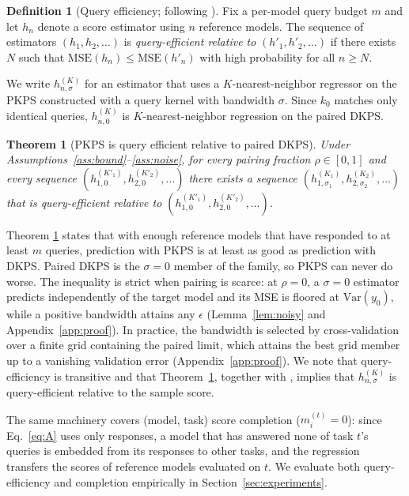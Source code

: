 \documentclass{article}
\newtheorem{theorem}{Theorem}
\theoremstyle{definition}
\newtheorem{definition}{Definition}
\theoremstyle{remark}
\theoremstyle{plain}
\newcommand{\PKPS}{PKPS\xspace}
\begin{document}
\begin{definition}[Query efficiency; following \citealp{dkps_qeff}]
\label{def:qeff}
Fix a per-model query budget $m$ and let $h_n$ denote a score estimator using $n$ reference models.
The sequence of estimators $(h_{1}, h_{2}, \hdots)$ is \emph{query-efficient relative to} $(h'_{1}, h'_{2}, \hdots )$ if there exists $N$ such that
$\mathrm{MSE}(h_n)\le\mathrm{MSE}(h'_n)$ with high probability for all $n\ge N$.
\end{definition}
We write $h_{n,\sigma}^{(K)}$ for an estimator that uses a $K$-nearest-neighbor
regressor on the \PKPS constructed with a query kernel with bandwidth $\sigma$.
Since $k_{0}$ matches only identical queries, $h_{n,0}^{(K)}$ is $K$-nearest-neighbor
regression on the paired DKPS.
\begin{theorem}[\PKPS is query efficient relative to paired DKPS]
\label{thm:qeff}
Under Assumptions~\ref{ass:bound}--\ref{ass:noise}, for every pairing fraction
$\rho\in[0,1]$ and every sequence
$(h_{1,0}^{(K'_{1})}, h_{2,0}^{(K'_{2})}, \hdots)$ there exists a sequence
$(h_{1,\sigma_{1}}^{(K_{1})}, h_{2,\sigma_{2}}^{(K_{2})}, \hdots)$ that is query-efficient relative to
$(h_{1,0}^{(K'_{1})}, h_{2,0}^{(K'_{2})}, \hdots)$.
\end{theorem}

Theorem \ref{thm:qeff} states that with enough reference models that have responded to at least $ m $ queries, prediction with \PKPS is at least as good as prediction with DKPS.
Paired DKPS is the $\sigma=0$ member of the family, so \PKPS can never do worse.
The inequality is strict when pairing is scarce: at
$\rho=0$, a $\sigma=0$ estimator predicts independently of the target model and its MSE
is floored at $\mathrm{Var}(y_{0})$, while a positive bandwidth attains any $\epsilon$
(Lemma~\ref{lem:noisy} and Appendix~\ref{app:proof}).
In practice, the bandwidth is selected by cross-validation over a finite grid containing
the paired limit, which attains the best grid member up to a vanishing validation error
(Appendix~\ref{app:proof}).
We note that query-efficiency is transitive and that Theorem~\ref{thm:qeff}, together with
\citet{dkps_qeff}, implies that $ h_{n,\sigma}^{(K)} $ is query-efficient relative to the sample score.

The same machinery covers (model, task) score completion ($m_i^{(t)}=0$): since
Eq.~\eqref{eq:A} uses only responses, a model that has answered none of task $t$'s
queries is embedded from its responses to other tasks, and the regression transfers
the scores of reference models evaluated on $t$.
We evaluate both query-efficiency and completion empirically in Section~\ref{sec:experiments}.
\end{document}
